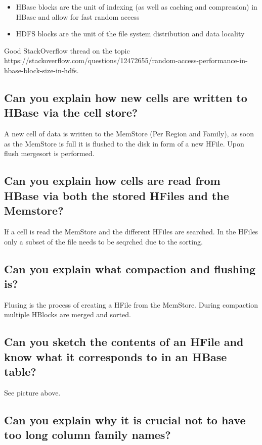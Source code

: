 \documentclass{article}
\begin{document}
\begin{itemize}
    \item HBase blocks are the unit of indexing (as well as caching and compression) in HBase and allow for fast random access
    \item HDFS blocks are the unit of the file system distribution and data locality
\end{itemize}

Good StackOverflow thread on the topic https://stackoverflow.com/questions/12472655/random-access-performance-in-hbase-block-size-in-hdfs. 

\subsection{Can you explain how new cells are written to HBase via the cell store?}

A new cell of data is written to the MemStore (Per Region and Family), as soon as the MemStore is full it is flushed to the disk in form of a new HFile. Upon flush mergesort is performed. 

\subsection{Can you explain how cells are read from HBase via both the stored HFiles and the Memstore?}

If a cell is read the MemStore and the different HFiles are searched. In the HFiles only a subset of the file needs to be seqrched due to the sorting. 

\subsection{Can you explain what compaction and flushing is?}

Flusing is the process of creating a HFile from the MemStore. During compaction multiple HBlocks are merged and sorted. 

\subsection{Can you sketch the contents of an HFile and know what it corresponds to in an HBase table?}

See picture above. 

\subsection{Can you explain why it is crucial not to have too long column family names?}
\end{document}

